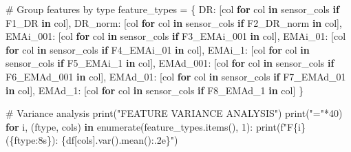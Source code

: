 \documentclass[
  letterpaper,
  DIV=11,
  numbers=noendperiod]{scrartcl}
\newenvironment{Shaded}{\begin{snugshade}}{\end{snugshade}}
\newcommand{\BuiltInTok}[1]{\textcolor[rgb]{0.00,0.23,0.31}{#1}}
\newcommand{\CommentTok}[1]{\textcolor[rgb]{0.37,0.37,0.37}{#1}}
\newcommand{\ControlFlowTok}[1]{\textcolor[rgb]{0.00,0.23,0.31}{\textbf{#1}}}
\newcommand{\DecValTok}[1]{\textcolor[rgb]{0.68,0.00,0.00}{#1}}
\newcommand{\KeywordTok}[1]{\textcolor[rgb]{0.00,0.23,0.31}{\textbf{#1}}}
\newcommand{\NormalTok}[1]{\textcolor[rgb]{0.00,0.23,0.31}{#1}}
\newcommand{\OperatorTok}[1]{\textcolor[rgb]{0.37,0.37,0.37}{#1}}
\newcommand{\SpecialCharTok}[1]{\textcolor[rgb]{0.37,0.37,0.37}{#1}}
\newcommand{\SpecialStringTok}[1]{\textcolor[rgb]{0.13,0.47,0.30}{#1}}
\newcommand{\StringTok}[1]{\textcolor[rgb]{0.13,0.47,0.30}{#1}}
\renewenvironment{Shaded}{%
  \begin{tcolorbox}[%
    enhanced,%
    colback=codebg,%
    colframe=codebg,%
    borderline west={3pt}{0pt}{sectionblue},%
    fontupper=\small\ttfamily,%
    boxrule=0pt,%
    arc=0pt,%
    boxsep=5pt,%
    left=2mm,%
    right=2mm,%
    top=2mm,%
    bottom=2mm%
  ]%
}{%
  \end{tcolorbox}%
}
\begin{document}
\begin{Shaded}
\begin{Highlighting}[]
\CommentTok{\# Group features by type}
\NormalTok{feature\_types }\OperatorTok{=}\NormalTok{ \{}
    \StringTok{\textquotesingle{}DR\textquotesingle{}}\NormalTok{: [col }\ControlFlowTok{for}\NormalTok{ col }\KeywordTok{in}\NormalTok{ sensor\_cols }\ControlFlowTok{if} \StringTok{\textquotesingle{}F1\_DR\textquotesingle{}} \KeywordTok{in}\NormalTok{ col],}
    \StringTok{\textquotesingle{}DR\_norm\textquotesingle{}}\NormalTok{: [col }\ControlFlowTok{for}\NormalTok{ col }\KeywordTok{in}\NormalTok{ sensor\_cols }\ControlFlowTok{if} \StringTok{\textquotesingle{}F2\_DR\_norm\textquotesingle{}} \KeywordTok{in}\NormalTok{ col],}
    \StringTok{\textquotesingle{}EMAi\_001\textquotesingle{}}\NormalTok{: [col }\ControlFlowTok{for}\NormalTok{ col }\KeywordTok{in}\NormalTok{ sensor\_cols }\ControlFlowTok{if} \StringTok{\textquotesingle{}F3\_EMAi\_001\textquotesingle{}} \KeywordTok{in}\NormalTok{ col],}
    \StringTok{\textquotesingle{}EMAi\_01\textquotesingle{}}\NormalTok{: [col }\ControlFlowTok{for}\NormalTok{ col }\KeywordTok{in}\NormalTok{ sensor\_cols }\ControlFlowTok{if} \StringTok{\textquotesingle{}F4\_EMAi\_01\textquotesingle{}} \KeywordTok{in}\NormalTok{ col],}
    \StringTok{\textquotesingle{}EMAi\_1\textquotesingle{}}\NormalTok{: [col }\ControlFlowTok{for}\NormalTok{ col }\KeywordTok{in}\NormalTok{ sensor\_cols }\ControlFlowTok{if} \StringTok{\textquotesingle{}F5\_EMAi\_1\textquotesingle{}} \KeywordTok{in}\NormalTok{ col],}
    \StringTok{\textquotesingle{}EMAd\_001\textquotesingle{}}\NormalTok{: [col }\ControlFlowTok{for}\NormalTok{ col }\KeywordTok{in}\NormalTok{ sensor\_cols }\ControlFlowTok{if} \StringTok{\textquotesingle{}F6\_EMAd\_001\textquotesingle{}} \KeywordTok{in}\NormalTok{ col],}
    \StringTok{\textquotesingle{}EMAd\_01\textquotesingle{}}\NormalTok{: [col }\ControlFlowTok{for}\NormalTok{ col }\KeywordTok{in}\NormalTok{ sensor\_cols }\ControlFlowTok{if} \StringTok{\textquotesingle{}F7\_EMAd\_01\textquotesingle{}} \KeywordTok{in}\NormalTok{ col],}
    \StringTok{\textquotesingle{}EMAd\_1\textquotesingle{}}\NormalTok{: [col }\ControlFlowTok{for}\NormalTok{ col }\KeywordTok{in}\NormalTok{ sensor\_cols }\ControlFlowTok{if} \StringTok{\textquotesingle{}F8\_EMAd\_1\textquotesingle{}} \KeywordTok{in}\NormalTok{ col]}
\NormalTok{\}}

\CommentTok{\# Variance analysis}
\BuiltInTok{print}\NormalTok{(}\StringTok{"FEATURE VARIANCE ANALYSIS"}\NormalTok{)}
\BuiltInTok{print}\NormalTok{(}\StringTok{"="}\OperatorTok{*}\DecValTok{40}\NormalTok{)}
\ControlFlowTok{for}\NormalTok{ i, (ftype, cols) }\KeywordTok{in} \BuiltInTok{enumerate}\NormalTok{(feature\_types.items(), }\DecValTok{1}\NormalTok{):}
    \BuiltInTok{print}\NormalTok{(}\SpecialStringTok{f"F}\SpecialCharTok{\{}\NormalTok{i}\SpecialCharTok{\}}\SpecialStringTok{ (}\SpecialCharTok{\{}\NormalTok{ftype}\SpecialCharTok{:8s\}}\SpecialStringTok{): }\SpecialCharTok{\{}\NormalTok{df[cols]}\SpecialCharTok{.}\NormalTok{var()}\SpecialCharTok{.}\NormalTok{mean()}\SpecialCharTok{:.2e\}}\SpecialStringTok{"}\NormalTok{)}


\end{Highlighting}
\end{Shaded}
\end{document}
